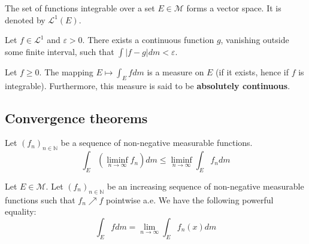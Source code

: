         \begin{theorem}
        	\label{lebesgue:L1}
			The set of functions integrable over a set $E\in\mathcal{M}$ forms a vector space. It is denoted by $\mathcal{L}^1(E)$.
		\end{theorem}
        
        \begin{property}
        	Let $f\in\mathcal{L}^1$ and $\varepsilon>0$. There exists a continuous function $g$, vanishing outside some finite interval, such that $\int|f-g|dm<\varepsilon$.
		\end{property}
        
        \begin{property}
        	\label{lebesgue:theorem:measure_by_integral}
			Let $f\geq0$. The mapping $E\mapsto\int_Efdm$ is a measure on $E$ (if it exists, hence if $f$ is integrable). Furthermore, this measure is said to be \textbf{absolutely continuous}.
		\end{property}

    \subsection{Convergence theorems}
    	\begin{theorem}
			Let $(f_n)_{n\in\mathbb{N}}$ be a sequence of non-negative measurable functions.
            \begin{equation}
				\label{lebesgue:theorem:fatous_lemma}
                \int_E\left(\liminf_{n\rightarrow\infty}f_n\right)dm \leq \liminf_{n\rightarrow\infty}\int_Ef_ndm
			\end{equation}
		\end{theorem}
        \begin{theorem}
			Let $E\in\mathcal{M}$. Let $(f_n)_{n\in\mathbb{N}}$ be an increasing sequence of non-negative measurable functions such that $f_n\nearrow f$ pointwise a.e. We have the following powerful equality:
            \begin{equation}
				\label{lebesgue:theorem:monotone_convergence_theorem}
                \boxed{\int_E fdm = \lim_{n\rightarrow\infty}\int_E f_n(x)dm}
			\end{equation}
		\end{theorem}
        
